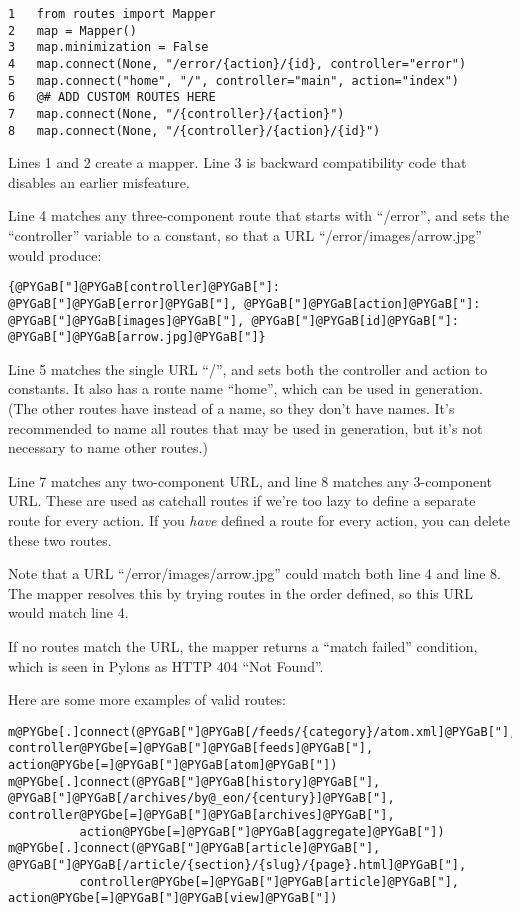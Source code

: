 \documentclass[letterpaper,10pt,english]{manual}
\begin{document}
\begin{Verbatim}[commandchars=@\[\]]
1   from routes import Mapper
2   map = Mapper()
3   map.minimization = False
4   map.connect(None, "/error/{action}/{id}, controller="error")
5   map.connect("home", "/", controller="main", action="index")
6   @# ADD CUSTOM ROUTES HERE
7   map.connect(None, "/{controller}/{action}")
8   map.connect(None, "/{controller}/{action}/{id}")
\end{Verbatim}

Lines 1 and 2 create a mapper.  Line 3 is backward compatibility code that
disables an earlier misfeature.

Line 4 matches any three-component route that starts with ``/error'', and sets
the ``controller'' variable to a constant, so that a URL
``/error/images/arrow.jpg'' would produce:

\begin{Verbatim}[commandchars=@\[\]]
{@PYGaB["]@PYGaB[controller]@PYGaB["]: @PYGaB["]@PYGaB[error]@PYGaB["], @PYGaB["]@PYGaB[action]@PYGaB["]: @PYGaB["]@PYGaB[images]@PYGaB["], @PYGaB["]@PYGaB[id]@PYGaB["]: @PYGaB["]@PYGaB[arrow.jpg]@PYGaB["]}
\end{Verbatim}

Line 5 matches the single URL ``/'', and sets both the controller and action to
constants.  It also has a route name ``home'', which can be used in generation.
(The other routes have  instead of a name, so they don't have names.
It's recommended to name all routes that may be used in generation, but it's
not necessary to name other routes.)

Line 7 matches any two-component URL, and line 8 matches any 3-component URL.
These are used as catchall routes if we're too lazy to define a separate route
for every action.  If you \emph{have} defined a route for every action, you can
delete these two routes.

Note that a URL ``/error/images/arrow.jpg'' could match both line 4 and line 8.
The mapper resolves this by trying routes in the order defined, so this URL
would match line 4.

If no routes match the URL, the mapper returns a ``match failed'' condition,
which is seen in Pylons as HTTP 404 ``Not Found''.

Here are some more examples of valid routes:

\begin{Verbatim}[commandchars=@\[\]]
m@PYGbe[.]connect(@PYGaB["]@PYGaB[/feeds/{category}/atom.xml]@PYGaB["], controller@PYGbe[=]@PYGaB["]@PYGaB[feeds]@PYGaB["], action@PYGbe[=]@PYGaB["]@PYGaB[atom]@PYGaB["])
m@PYGbe[.]connect(@PYGaB["]@PYGaB[history]@PYGaB["], @PYGaB["]@PYGaB[/archives/by@_eon/{century}]@PYGaB["], controller@PYGbe[=]@PYGaB["]@PYGaB[archives]@PYGaB["],
          action@PYGbe[=]@PYGaB["]@PYGaB[aggregate]@PYGaB["])
m@PYGbe[.]connect(@PYGaB["]@PYGaB[article]@PYGaB["], @PYGaB["]@PYGaB[/article/{section}/{slug}/{page}.html]@PYGaB["],
          controller@PYGbe[=]@PYGaB["]@PYGaB[article]@PYGaB["], action@PYGbe[=]@PYGaB["]@PYGaB[view]@PYGaB["])
\end{Verbatim}
\end{document}
